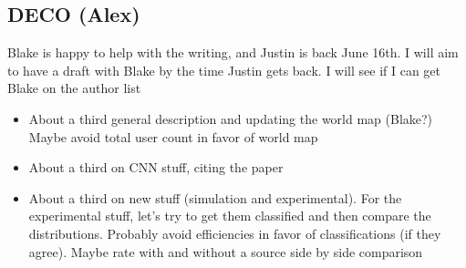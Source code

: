 \subsection{DECO (Alex)}
Blake is happy to help with the writing, and Justin is back June 16th. I will aim to have a draft with Blake by the time Justin gets back. I will see if I can get Blake on the author list
\begin{itemize}
    \itemsep-0.85em 
    \item About a third general description and updating the world map (Blake?) Maybe avoid total user count in favor of world map
    \item About a third on CNN stuff, citing the paper
    \item About a third on new stuff (simulation and experimental). For the experimental stuff, let's try to get them classified and then compare the distributions. Probably avoid efficiencies in favor of classifications (if they agree). Maybe rate with and without a source side by side comparison
\end{itemize}


